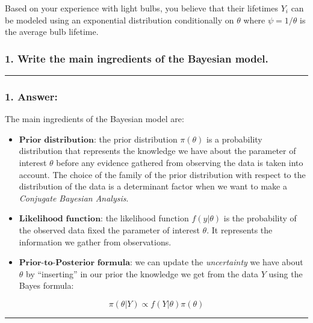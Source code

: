 \documentclass[
]{article}
\begin{document}
Based on your experience with light bulbs, you believe that their
lifetimes \(Y_i\) can be modeled using an exponential distribution
conditionally on \(\theta\) where \(\psi = 1/\theta\) is the average
bulb lifetime.

\hypertarget{write-the-main-ingredients-of-the-bayesian-model.}{%
\subsubsection{1. Write the main ingredients of the Bayesian
model.}\label{write-the-main-ingredients-of-the-bayesian-model.}}

\begin{center}\rule{0.5\linewidth}{0.5pt}\end{center}

\hypertarget{answer-4}{%
\subsubsection{1. Answer:}\label{answer-4}}

The main ingredients of the Bayesian model are:

\begin{itemize}
\item
  \(\textbf{Prior distribution}\): the prior distribution
  \(\pi(\theta)\) is a probability distribution that represents the
  knowledge we have about the parameter of interest \(\theta\) before
  any evidence gathered from observing the data is taken into account.
  The choice of the family of the prior distribution with respect to the
  distribution of the data is a determinant factor when we want to make
  a \emph{Conjugate Bayesian Analysis}.
\item
  \(\textbf{Likelihood function}\): the likelihood function
  \(f(y | \theta)\) is the probability of the observed data fixed the
  parameter of interest \(\theta\). It represents the information we
  gather from observations.
\item
  \(\textbf{Prior-to-Posterior formula}\): we can update the
  \emph{uncertainty} we have about \(\theta\) by ``inserting'' in our
  prior the knowledge we get from the data \(Y\) using the Bayes
  formula:
\end{itemize}

\[
\pi(\theta | Y) \propto f(Y | \theta) \pi(\theta)
\]

\begin{center}\rule{0.5\linewidth}{0.5pt}\end{center}
\end{document}
